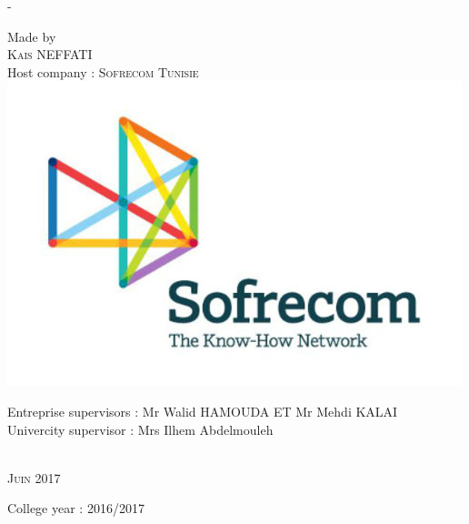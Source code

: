 \begin{titlingpage}
\begin{SingleSpace}
\begin{adjustwidth*}{\unitlength}{-\unitlength}
\begin{center}
\vspace{6.5mm}
{\normalsize Made by}\\
\vspace{5mm}
{\large\textsc{Kais NEFFATI}}\\
\vspace{10mm}
{\large Host company : \textsc{Sofrecom Tunisie}}\\
\vspace{5mm}
\includegraphics[scale=0.2]{logos/logo-sofrecom}\\
\vspace{10mm}
\begin{minipage}{15cm}
\begin{center}
{\small Entreprise supervisors : Mr Walid HAMOUDA ET Mr Mehdi KALAI }\\
\vspace{3mm}
{\small Univercity supervisor : Mrs Ilhem Abdelmouleh  }\\
\end{center}
\end{minipage}\\
\vspace{8mm}
{\large\textsc{Juin 2017}}\\
\vspace{8mm}
\end{center}
\begin{flushright}
{\small College year : 2016/2017}
\end{flushright}
\end{adjustwidth*}
\end{SingleSpace}
\end{titlingpage}